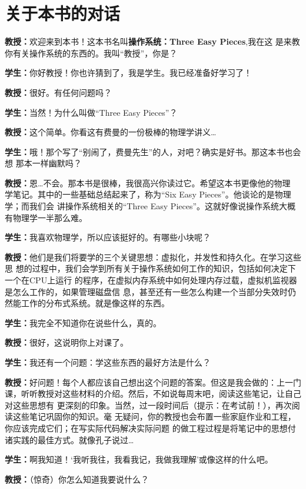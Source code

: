 \chapter{关于本书的对话}
\begin{mydlg}
	\textbf{教授：}欢迎来到本书！这本书名叫\textbf{操作系统：Three Easy Pieces},我在这
	是来教你有关操作系统的东西的。我叫“教授”，你是？
	
	\textbf{学生：}你好教授！你也许猜到了，我是学生。我已经准备好学习了！
	
	\textbf{教授：}很好。有任何问题吗？
	
	\textbf{学生：}当然！为什么叫做“Three Easy Pieces”？
	
	\textbf{教授：}这个简单。你看这有费曼的一份极棒的物理学讲义\ldots
	
	\textbf{学生：}哦！那个写了“别闹了，费曼先生”的人，对吧？确实是好书。那这本书也会想
	那本一样幽默吗？
	
	\textbf{教授：}恩\ldots 不会。那本书是很棒，我很高兴你读过它。希望这本书更像他的物理
	学笔记。其中的一些基础总结起来了，称为“Six Easy Pieces”。他谈论的是物理学；而我们会
	讲操作系统相关的“Three Easy Pieces”。这就好像说操作系统大概有物理学一半那么难。
	
	\textbf{学生：}我喜欢物理学，所以应该挺好的。有哪些小块呢？
	
	\textbf{教授：}他们是我们将要学的三个关键思想：虚拟化，并发性和持久化。在学习这些思
	想的过程中，我们会学到所有关于操作系统如何工作的知识，包括如何决定下一个在CPU上运行
	的程序，在虚拟内存系统中如何处理内存过载，虚拟机监视器是怎么工作的，如果管理磁盘信
	息，甚至还有一些怎么构建一个当部分失效时仍然能工作的分布式系统。就是像这样的东西。
	
	\textbf{学生：}我完全不知道你在说些什么，真的。
	
	\textbf{教授：}很好，这说明你上对课了。
	
	\textbf{学生：}我还有一个问题：学这些东西的最好方法是什么？
	
	\textbf{教授：}好问题！每个人都应该自己想出这个问题的答案。但这是我会做的：上一门
	课，听听教授对这些材料的介绍。然后，不如说每周末吧，阅读这些笔记，让自己对这些思想有
	更深刻的印象。当然，过一段时间后（提示：在考试前！），再次阅读这些笔记巩固你的知识。毫
	无疑问，你的教授也会布置一些家庭作业和工程，你应该完成它们；在写实际代码解决实际问题
	的做工程过程是将笔记中的思想付诸实践的最佳方式。就像孔子说过\ldots
	
	\textbf{学生：}啊我知道！‘我听我往，我看我记，我做我理解’或像这样的什么吧。
	
	\textbf{教授：}（惊奇）你怎么知道我要说什么？
	

\end{mydlg}
